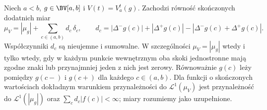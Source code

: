 \begin{twierdzenie}\label{ma1:kh:thm:ks-variation-measure-defect}
Niech $a<b$, $g\in\BV[a,b]$ i $V(t)=V_a^t(g)$. Zachodzi równość skończonych dodatnich miar
\[
 \mu_V=|\mu_g|+\sum_{c\in(a,b)}d_c\,\delta_c,
 \qquad
 d_c=|\Delta^-g(c)|+|\Delta^+g(c)|
      -|\Delta^-g(c)+\Delta^+g(c)|.
\]
Współczynniki $d_c$ są nieujemne i sumowalne. W szczególności $\mu_V=|\mu_g|$ wtedy i tylko wtedy, gdy w każdym punkcie wewnętrznym oba skoki jednostronne mają zgodne znaki lub przynajmniej jeden z nich jest zerowy. Równoważnie $g(c)$ leży pomiędzy $g(c-)$ i $g(c+)$ dla każdego $c\in(a,b)$. Dla funkcji o skończonych wartościach dokładnym warunkiem przynależności do $\mathcal L^1(\mu_V)$ jest przynależność do $\mathcal L^1(|\mu_g|)$ oraz $\sum_c d_c|f(c)|<\infty$; miary rozumiemy jako uzupełnione.
\end{twierdzenie}

